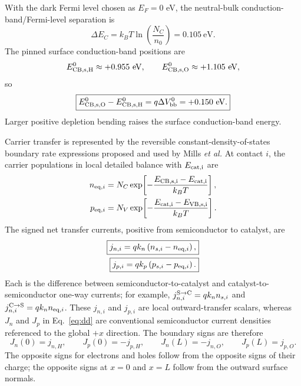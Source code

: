 \documentclass[11pt]{article}
\begin{document}
With the dark Fermi level chosen as $E_F=0$ eV, the neutral-bulk conduction-band/Fermi-level separation is
\begin{equation}
\Delta E_C=k_BT\ln\!\left(\frac{N_C}{n_0}\right)=0.105~\mathrm{eV}.
\end{equation}
The pinned surface conduction-band positions are
\begin{equation}
E_{\rm CB,s,H}^0\approx+0.955~\mathrm{eV},\qquad
E_{\rm CB,s,O}^0\approx+1.105~\mathrm{eV},
\end{equation}
so
\begin{equation}
\boxed{E_{\rm CB,s,O}^0-E_{\rm CB,s,H}^0=q\Delta V_{\rm bb}^0=+0.150~\mathrm{eV}.}
\label{eq:nativeasymmetry}
\end{equation}
Larger positive depletion bending raises the surface conduction-band energy.

Carrier transfer is represented by the reversible constant-density-of-states boundary rate expressions proposed and used by Mills \textit{et al.}\cite{mills2014} At contact $i$, the carrier populations in local detailed balance with $E_{\rm cat,i}$ are
\begin{align}
n_{{\rm eq},i}&=N_C\exp\!\left[-\frac{E_{\rm CB,s,i}-E_{\rm cat,i}}{k_BT}\right],\\
p_{{\rm eq},i}&=N_V\exp\!\left[-\frac{E_{\rm cat,i}-E_{\rm VB,s,i}}{k_BT}\right].
\end{align}
The signed net transfer currents, positive from semiconductor to catalyst, are
\begin{align}
\boxed{j_{n,i}=qk_n\left(n_{s,i}-n_{{\rm eq},i}\right),}\\
\boxed{j_{p,i}=qk_p\left(p_{s,i}-p_{{\rm eq},i}\right).}
\label{eq:carriertransfer}
\end{align}
Each is the difference between semiconductor-to-catalyst and catalyst-to-semiconductor one-way currents; for example, $j_{n,i}^{\rm S\rightarrow C}=qk_n n_{s,i}$ and $j_{n,i}^{\rm C\rightarrow S}=qk_n n_{{\rm eq},i}$. These $j_{n,i}$ and $j_{p,i}$ are local outward-transfer scalars, whereas $J_n$ and $J_p$ in Eq.~\ref{eq:dd} are conventional semiconductor current densities referenced to the global $+x$ direction. The boundary signs are therefore
\begin{equation}
J_n(0)=j_{n,H},\qquad J_p(0)=-j_{p,H},\qquad
J_n(L)=-j_{n,O},\qquad J_p(L)=j_{p,O}.
\label{eq:transfer-signs}
\end{equation}
The opposite signs for electrons and holes follow from the opposite signs of their charge; the opposite signs at $x=0$ and $x=L$ follow from the outward surface normals.
\end{document}
